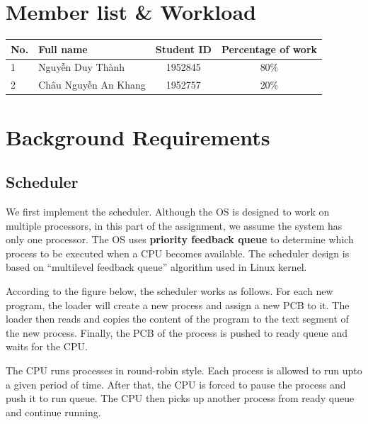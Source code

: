 \documentclass[a4paper]{article}
\numberwithin{equation}{section}
\begin{document}

\newpage
\tableofcontents
\newpage


\section*{Member list \& Workload}
\begin{center}
  \begin{tabular}{llcc}
    \toprule
    \textbf{No.} & \textbf{Full name}             & \textbf{Student ID} &  \textbf{Percentage of work} \\
    \midrule
    1            & Nguyễn Duy Thành     & 1952845   & 80\% \\
    2            & Châu Nguyễn An Khang & 1952757   & 20\% \\
    \bottomrule
  \end{tabular}
\end{center}

\newpage

\section{Background Requirements}

\subsection{Scheduler}

We first implement the scheduler. Although the OS is designed to work on multiple processors, in this part of the assignment, we assume the system has only one processor. The OS uses \textbf{priority feedback queue} to determine which process to be executed when a CPU becomes available. The scheduler design is based on “multilevel feedback queue” algorithm used in Linux kernel.

According to the figure below, the scheduler works as follows. For each new program, the loader will create a new process and assign a new PCB to it. The loader then reads and copies the content of the program to the text segment of the new process. Finally, the PCB of the process is pushed to ready queue and waits for the CPU. 

The CPU runs processes in round-robin style. Each process is allowed to run upto a given period of time. After that, the CPU is forced to pause the process and push it to run queue. The CPU then picks up another process from ready queue and continue running. 
\end{document}
